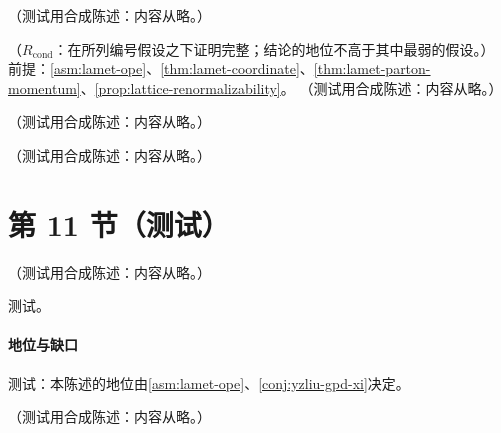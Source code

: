 \begin{remark}\label{rem:lamet-domain}
（测试用合成陈述：内容从略。）
\end{remark}

\begin{proposition}\label{prop:lamet-sdf}
（$R_{\mathrm{cond}}$：在所列编号假设之下证明完整；结论的地位不高于其中最弱的假设。）
前提：\cref{asm:lamet-ope}、\cref{thm:lamet-coordinate}、\cref{thm:lamet-parton-momentum}、\cref{prop:lattice-renormalizability}。
（测试用合成陈述：内容从略。）
\end{proposition}

\begin{remark}\label{rem:lamet-inverse-problem}
（测试用合成陈述：内容从略。）
\end{remark}

\begin{definition}[准 GPD 与准 DA]\label{def:lamet-quasi-gpd}
（测试用合成陈述：内容从略。）
\end{definition}

\section{第 11 节（测试）}\label{sec:lamet-sdf}

\begin{theorem}\label{thm:lamet-quasi-gpd}
（测试用合成陈述：内容从略。）
\end{theorem}
\begin{proofsketch}测试。\end{proofsketch}
\paragraph{地位与缺口}测试：本陈述的地位由\cref{asm:lamet-ope}、\cref{conj:yzliu-gpd-xi}决定。

\begin{proposition}\label{prop:lamet-other-objects}
（测试用合成陈述：内容从略。）
\end{proposition}
